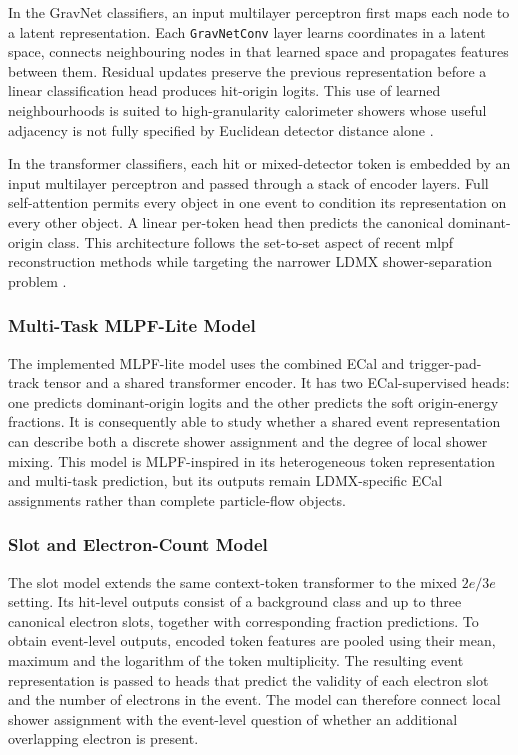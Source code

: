 In the GravNet classifiers, an input multilayer perceptron first maps each
node to a latent representation. Each \texttt{GravNetConv} layer learns
coordinates in a latent space, connects neighbouring nodes in that learned
space and propagates features between them. Residual updates preserve the
previous representation before a linear classification head produces
hit-origin logits. This use of learned neighbourhoods is suited to
high-granularity calorimeter showers whose useful adjacency is not fully
specified by Euclidean detector distance alone \cite{qasim2019-gravnet}.

In the transformer classifiers, each hit or mixed-detector token is embedded
by an input multilayer perceptron and passed through a stack of encoder
layers. Full self-attention permits every object in one event to condition its
representation on every other object. A linear per-token head then predicts
the canonical dominant-origin class. This architecture follows the
set-to-set aspect of recent \gls{mlpf} reconstruction methods while targeting
the narrower LDMX shower-separation problem \cite{pata2026-mlpf}.

\subsubsection{Multi-Task MLPF-Lite Model}

The implemented MLPF-lite model uses the combined ECal and trigger-pad-track
tensor and a shared transformer encoder. It has two ECal-supervised heads:
one predicts dominant-origin logits and the other predicts the soft
origin-energy fractions. It is consequently able to study whether a shared
event representation can describe both a discrete shower assignment and the
degree of local shower mixing. This model is MLPF-inspired in its
heterogeneous token representation and multi-task prediction, but its
outputs remain LDMX-specific ECal assignments rather than complete
particle-flow objects.

\subsubsection{Slot and Electron-Count Model}

The slot model extends the same context-token transformer to the mixed
\(2e/3e\) setting. Its hit-level outputs consist of a background class and up
to three canonical electron slots, together with corresponding fraction
predictions. To obtain event-level outputs, encoded token features are pooled
using their mean, maximum and the logarithm of the token multiplicity. The
resulting event representation is passed to heads that predict the validity
of each electron slot and the number of electrons in the event. The model can
therefore connect local shower assignment with the event-level question of
whether an additional overlapping electron is present.


